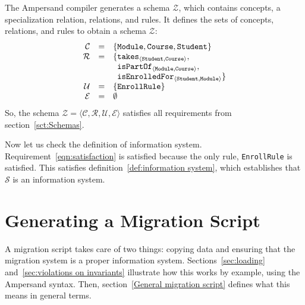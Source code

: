 \documentclass[runningheads]{llncs}
\newcommand{\id}[1]{\text{\it #1\/}}
\newcommand{\maintain}{\mathbin{\id{maint}}}
\newcommand{\declare}[3]{\id{#1}_{\pair{#2}{#3}}}
\newcommand{\pair}[2]{\langle{#1},{#2}\rangle}
\newcommand{\triple}[3]{\langle{#1},{#2},{#3}\rangle}
\newcommand{\quadruple}[4]{\langle{#1},{#2},{#3},{#4}\rangle}
\newcommand{\concepts}{\mathcal{C}}
\newcommand{\rels}{\mathcal{R}}   %
\newcommand{\enforces}{\mathcal{E}}
\newcommand{\rules}{\mathcal{U}}
\newcommand{\roles}{\mathcal{O}}
\newcommand{\dataset}{\mathscr{D}}
\newcommand{\schema}{\mathscr{Z}}
\newcommand{\infsys}{\mathscr{S}}
\newcommand{\isa}{\preceq}
\begin{document}
   The Ampersand compiler generates a schema $\schema$, which contains concepts, a specialization relation, relations, and rules.
   It defines the sets of concepts, relations, and rules to obtain a schema $\schema$:
\[\begin{array}{rcl}
   \concepts&=&\{ {\tt Module}, {\tt Course}, {\tt Student}\}\\
   \rels&=&\{\begin{array}[t]{@{}l@{}}
               \declare{\tt takes}{\tt Student}{\tt Course},\\
               \declare{\tt isPartOf}{\tt Module}{\tt Course},\\
               \declare{\tt isEnrolledFor}{\tt Student}{\tt Module}\}
             \end{array}\\
   \rules&=&\{ {\tt EnrollRule}\}\\
   \enforces&=&\emptyset
  \end{array}
\]
   So, the schema $\schema=\quadruple{\concepts}{\rels}{\rules}{\enforces}$ satisfies all requirements from section~\ref{sct:Schemas}.

   Now let us check the definition of information system.
   Requirement~\ref{eqn:satisfaction} is satisfied because the only rule, {\tt EnrollRule} is satisfied.
   This satisfies definition~\ref{def:information system}, which establishes that $\infsys$ is an information system.

\section{Generating a Migration Script}
   A migration script takes care of two things: copying data and ensuring that the migration system is a proper information system.
   Sections~\ref{sec:loading} and~\ref{sec:violations on invariants} illustrate how this works by example, using the Ampersand syntax.
   Then, section~\ref{General migration script} defines what this means in general terms.
\end{document}
